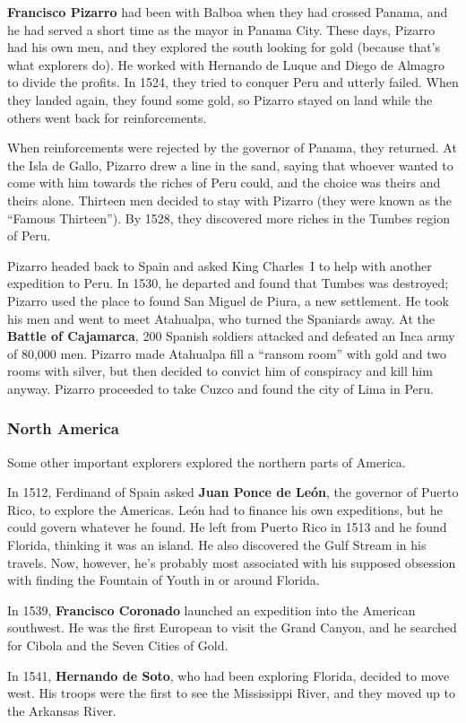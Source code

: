 \textbf{Francisco Pizarro} had been with Balboa when they had crossed Panama,
and he had served a short time as the mayor in Panama City.
These days, Pizarro had his own men, and they explored the south looking for gold (because that's what explorers do).
He worked with Hernando de Luque and Diego de Almagro to divide the profits.
In 1524, they tried to conquer Peru and utterly failed.
When they landed again, they found some gold,
so Pizarro stayed on land while the others went back for reinforcements.

When reinforcements were rejected by the governor of Panama, they returned.
At the Isla de Gallo, Pizarro drew a line in the sand,
saying that whoever wanted to come with him towards the riches of Peru could,
and the choice was theirs and theirs alone.
Thirteen men decided to stay with Pizarro (they were known as the ``Famous Thirteen'').
By 1528, they discovered more riches in the Tumbes region of Peru.

Pizarro headed back to Spain and asked King Charles~I to help with another expedition to Peru.
In 1530, he departed and found that Tumbes was destroyed;
Pizarro used the place to found San Miguel de Piura, a new settlement.
He took his men and went to meet Atahualpa, who turned the Spaniards away.
At the \textbf{Battle of Cajamarca}, 200 Spanish soldiers attacked and defeated an Inca army of 80,000 men.
Pizarro made Atahualpa fill a ``ransom room'' with gold and two rooms with silver,
but then decided to convict him of conspiracy and kill him anyway.
Pizarro proceeded to take Cuzco and found the city of Lima in Peru.

\subsubsection*{North America}

Some other important explorers explored the northern parts of America.

In 1512, Ferdinand of Spain asked \textbf{Juan Ponce de Le\'on},
the governor of Puerto Rico, to explore the Americas.
Le\'on had to finance his own expeditions, but he could govern whatever he found.
He left from Puerto Rico in 1513 and he found Florida, thinking it was an island.
He also discovered the Gulf Stream in his travels.
Now, however, he's probably most associated with his supposed obsession
with finding the Fountain of Youth in or around Florida.

In 1539, \textbf{Francisco Coronado} launched an expedition into the American southwest.
He was the first European to visit the Grand Canyon,
and he searched for Cibola and the Seven Cities of Gold.

In 1541, \textbf{Hernando de Soto}, who had been exploring Florida, decided to move west.
His troops were the first to see the Mississippi River, and they moved up to the Arkansas River.
